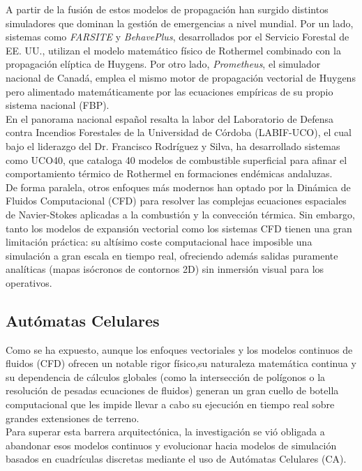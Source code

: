     A partir de la fusión de estos modelos de propagación han surgido distintos simuladores que dominan la gestión de emergencias a nivel mundial. Por un lado, sistemas como \textit{FARSITE} y \textit{BehavePlus}, desarrollados por el Servicio Forestal de EE. UU., utilizan el modelo matemático físico de Rothermel combinado con la propagación elíptica de Huygens. Por otro lado, \textit{Prometheus}, el simulador nacional de Canadá, emplea el mismo motor de propagación vectorial de Huygens pero alimentado matemáticamente por las ecuaciones empíricas de su propio sistema nacional (FBP). \\

    En el panorama nacional español resalta la labor del Laboratorio de Defensa contra Incendios Forestales de la Universidad de Córdoba (LABIF-UCO), el cual bajo el liderazgo del Dr. Francisco Rodríguez y Silva, ha desarrollado sistemas como UCO40, que cataloga 40 modelos de combustible superficial para afinar el comportamiento térmico de Rothermel en formaciones endémicas andaluzas\cite{uco40_rodriguez}.\\

    De forma paralela, otros enfoques más modernos han optado por la Dinámica de Fluidos Computacional (CFD) para resolver las complejas ecuaciones espaciales de Navier-Stokes aplicadas a la combustión y la convección térmica. Sin embargo, tanto los modelos de expansión vectorial como los sistemas CFD tienen una gran limitación práctica: su altísimo coste computacional hace imposible una simulación a gran escala en tiempo real, ofreciendo además salidas puramente analíticas (mapas isócronos de contornos 2D) sin inmersión visual para los operativos.\cite{cfd}\\

    \subsection{Autómatas Celulares}    
        Como se ha expuesto, aunque los enfoques vectoriales y los modelos continuos de fluidos (CFD) ofrecen un notable rigor físico,su naturaleza matemática continua y su dependencia de cálculos globales (como la intersección de polígonos o la resolución de pesadas ecuaciones de fluidos) generan un gran cuello de botella computacional que les impide llevar a cabo su ejecución en tiempo real sobre grandes extensiones de terreno.\\

        Para superar esta barrera arquitectónica, la investigación se vió obligada a abandonar esos modelos continuos y evolucionar hacia modelos de simulación basados en cuadrículas discretas mediante el uso de Autómatas Celulares (CA). \\

